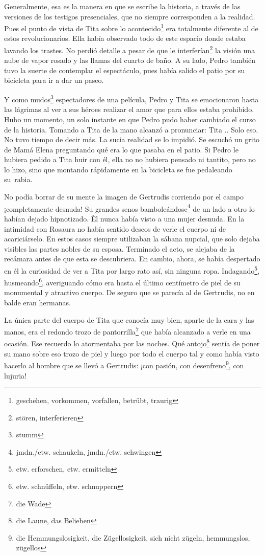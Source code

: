 Generalmente, esa es la manera en que se escribe la historia, a través
de las versiones de los testigos presenciales, que no siempre
corresponden a la realidad. Pues el punto de vista de Tita sobre lo acontecido\footnote{geschehen, vorkommen, vorfallen, betrübt, traurig}
era totalmente diferente al de estos revolucionarios. Ella
había observado todo de este espacio donde estaba lavando los trastes.
No perdió detalle a pesar de que le interferían\footnote{stören, interferieren}
la visión una nube de vapor rosado y las llamas del cuarto de baño.
A su lado, Pedro también tuvo la suerte de contemplar el espectáculo,
pues había salido el patio por su bicicleta para ir a dar un paseo.

Y como mudos\footnote{stumm} espectadores de una película, Pedro y
Tita se emocionaron hasta las lágrimas al ver a sus héroes realizar el
amor que para ellos estaba prohibido. Hubo un momento, un solo instante
en que Pedro pudo haber cambiado el curso de la historia. Tomando a Tita
de la mano alcanzó a pronunciar: \glqq{}Tita \ndots.\grqq{}. Solo eso. No tuvo tiempo
de decir más. La sucia realidad se lo impidió. Se escuchó un grito de
Mamá Elena preguntando qué era lo que pasaba en el patio. Si Pedro le
hubiera pedido a Tita huir con él, ella no no hubiera pensado ni tantito,
pero no lo hizo, sino que montando rápidamente en la bicicleta se fue
pedaleando su~rabia.

No podía borrar de su mente la imagen de Gertrudis corriendo por el
campo \ndots ¡completamente desnuda! Su grandes senos bamboleándose\footnote{jmdn./etw. schaukeln, jmdn./etw. schwingen} de
un lado a otro lo habían dejado hipnotizado. Èl nunca había visto a una
mujer desnuda. En la intimidad con Rosaura no había sentido deseos de
verle el cuerpo ni de acariciárselo. En estos casos siempre utilizaban
la sábana nupcial, que solo dejaba visibles las partes nobles de su
esposa. Terminado el acto, se alejaba de la recámara antes de que esta
se descubriera. En cambio, ahora, se había despertado en él la
curiosidad de ver a Tita por largo rato así, sin ninguna ropa.
 Indagando\footnote{etw. erforschen, etw. ermitteln}, husmeando\footnote{etw. schnüffeln, etw. schnuppern}, averiguando
cómo era hasta el último centímetro de piel de su monumental y atractivo
cuerpo. De seguro que se parecía al de Gertrudis, no en balde eran hermanas.

La única parte del cuerpo de Tita que conocía muy bien, aparte de la
cara y las manos, era el redondo trozo de pantorrilla\footnote{die Wade}
que había alcanzado a verle en una ocasión. Ese recuerdo lo atormentaba
por las noches. Qué antojo\footnote{die Laune, das Belieben} sentía
de poner su mano sobre eso trozo de piel y luego por todo el cuerpo tal
y como había visto hacerlo al hombre que se llevó a Gertrudis:
¡con pasión, con desenfreno\footnote{die Hemmungslosigkeit, die Zügellosigkeit, sich nicht zügeln, hemmungslos, zügellos},
con lujuria!

